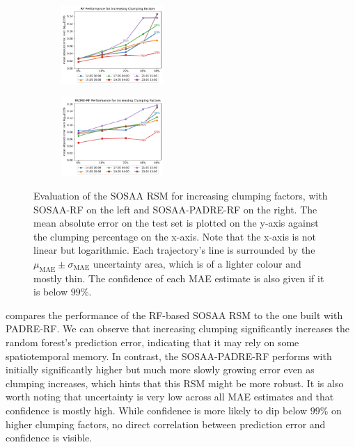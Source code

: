 \begin{figure}[H]
    \centering
    \begin{subfigure}
        \centering
        \includegraphics[width=0.425\textwidth]{evaluation/figures/results/clumped-generalisation-rf.pdf}
    \end{subfigure}
    \begin{subfigure}
        \centering
        \includegraphics[width=0.425\textwidth]{evaluation/figures/results/clumped-generalisation-padre-rf.pdf}
    \end{subfigure}

    \caption[Evaluation of the SOSAA RSM for increasing Clumping Factors]{Evaluation of the SOSAA RSM for increasing clumping factors, with SOSAA-RF on the left and SOSAA-PADRE-RF on the right. The mean absolute error on the test set is plotted on the y-axis against the clumping percentage on the x-axis. Note that the x-axis is not linear but logarithmic. Each trajectory's line is surrounded by the $\mu_{\text{MAE}} \pm \sigma_{\text{MAE}}$ uncertainty area, which is of a lighter colour and mostly thin. The confidence of each MAE estimate is also given if it is below $99\%$.}
    \label{fig:sosaa-rsm-clumping}
\end{figure}

\noindent {} compares the performance of the RF-based SOSAA RSM to the one built with PADRE-RF. We can observe that increasing clumping significantly increases the random forest's prediction error, indicating that it may rely on some spatiotemporal memory. In contrast, the SOSAA-PADRE-RF performs with initially significantly higher but much more slowly growing error even as clumping increases, which hints that this RSM might be more robust. It is also worth noting that uncertainty is very low across all MAE estimates and that confidence is mostly high. While confidence is more likely to dip below $99\%$ on higher clumping factors, no direct correlation between prediction error and confidence is visible.

